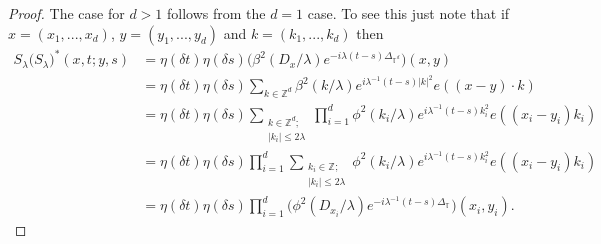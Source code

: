 \documentclass[11pt]{amsart}
\numberwithin{equation}{section}
\newcommand{\la}{\lambda}
\newcommand{\Z}[1][]{\mathbb{Z}^#1}
\newcommand{\T}[1][]{\mathbb{T}^#1}
\newcommand{\laplac}[1]{\Delta_{#1}}
\newcommand{\Sl}{S_{\la}}
\begin{document}
\begin{proof}
    
The case for $d > 1$ follows from the $d = 1$ case. To see this just note that if $x = (x_1,...,x_d)$, $y = (y_1,...,y_d)$ and $k = (k_1,...,k_d)$ then
\begin{equation}
\begin{split}
     \Sl\big(\Sl\big)^*(x,t;y,s) &= \eta(\delta t)\eta(\delta s)\big(\beta^2(D_x/\la)e^{-i\la(t-s)\laplac{\T{d}}}\big)(x,y) \\
     &= \eta(\delta t)\eta(\delta s) \sum_{k \in \Z{d}}\beta^2(k/\la)e^{i\la^{-1}(t-s)|k|^2}e((x-y) \cdot k) \\
     &= \eta(\delta t)\eta(\delta s)\sum_{\substack{k \in \Z{d}; \\ |k_i| \leq 2\la}} \prod_{i = 1}^d\phi^2(k_i / \la)e^{i\la^{-1}(t-s)k_{i}^2}e((x_i - y_i)k_{i}) \\
     &= \eta(\delta t)\eta(\delta s)\prod_{i = 1}^{d}\sum_{\substack{k_i \in \Z{}; \\ |k_i| \leq 2 \la}}\phi^2(k_i / \la)e^{i\la^{-1}(t-s)k_{i}^2}e((x_i - y_i)k_i) \\
     &= \eta(\delta t)\eta(\delta s)\prod_{i = 1}^{d}\big(\phi^2(D_{x_i}/ \la )e^{-i\la^{-1}(t-s)\laplac{\T{}}}\big)(x_i,y_i).
\end{split}
\end{equation}



\end{proof}
\end{document}
